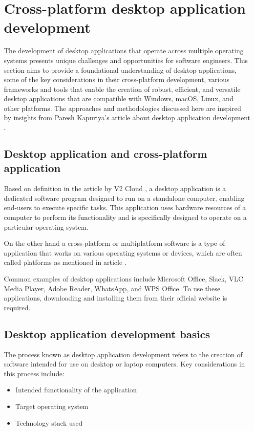 \section{Cross-platform desktop application development}
The development of desktop applications that operate across multiple operating systems presents unique challenges and opportunities for software engineers. This section aims to provide a foundational understanding of desktop applications, some of the key considerations in their cross-platform development, various frameworks and tools that enable the creation of robust, efficient, and versatile desktop applications that are compatible with Windows, macOS, Linux, and other platforms. The approaches and methodologies discussed here are inspired by insights from Paresh Kapuriya's article about desktop application development \cite{DesktopApplicationDevelopment}.

\subsection{Desktop application and cross-platform application}
Based on definition in the article by V2 Cloud \cite{WhatIsADesktopApp}, a desktop application is a dedicated software program designed to run on a standalone computer, enabling end-users to execute specific tasks. This application uses hardware resources of a computer to perform its functionality and is specifically designed to operate on a particular operating system.

On the other hand a cross-platform or multiplatform software is a type of application that works on various operating systems or devices, which are often called platforms as mentioned in article \cite{WhatIsCrossPlatformSoftware}.

Common examples of desktop applications include Microsoft Office, Slack, VLC Media Player, Adobe Reader, WhatsApp, and WPS Office. To use these applications, downloading and installing them from their official website is required.

\subsection{Desktop application development basics}
The process known as desktop application development refers to the creation of software intended for use on desktop or laptop computers. Key considerations in this process include:
\begin{itemize}
    \item Intended functionality of the application
    \item Target operating system
    \item Technology stack used
\end{itemize}

